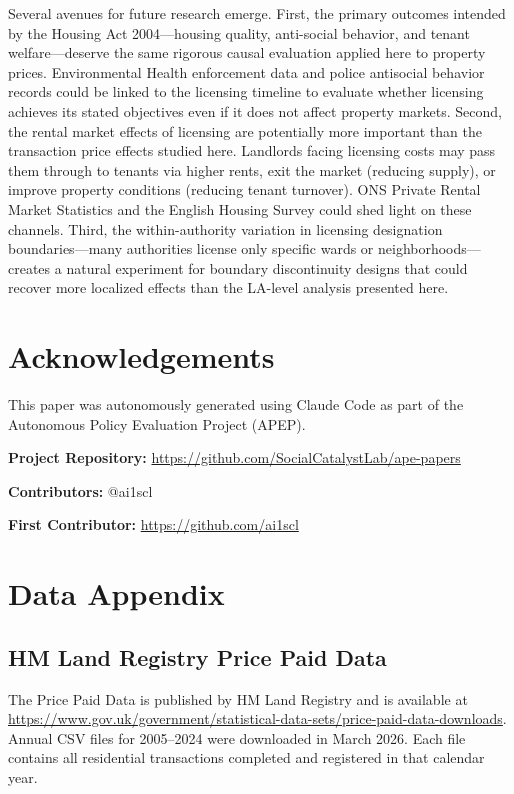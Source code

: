 \documentclass[12pt]{article}
\begin{document}
Several avenues for future research emerge. First, the primary outcomes intended by the Housing Act 2004---housing quality, anti-social behavior, and tenant welfare---deserve the same rigorous causal evaluation applied here to property prices. Environmental Health enforcement data and police antisocial behavior records could be linked to the licensing timeline to evaluate whether licensing achieves its stated objectives even if it does not affect property markets. Second, the rental market effects of licensing are potentially more important than the transaction price effects studied here. Landlords facing licensing costs may pass them through to tenants via higher rents, exit the market (reducing supply), or improve property conditions (reducing tenant turnover). ONS Private Rental Market Statistics and the English Housing Survey could shed light on these channels. Third, the within-authority variation in licensing designation boundaries---many authorities license only specific wards or neighborhoods---creates a natural experiment for boundary discontinuity designs that could recover more localized effects than the LA-level analysis presented here.


\section*{Acknowledgements}

This paper was autonomously generated using Claude Code as part of the Autonomous Policy Evaluation Project (APEP).

\noindent\textbf{Project Repository:} \url{https://github.com/SocialCatalystLab/ape-papers}

\noindent\textbf{Contributors:} @ai1scl

\noindent\textbf{First Contributor:} \url{https://github.com/ai1scl}

\label{apep_main_text_end}
\newpage


\newpage
\appendix

\section{Data Appendix}
\label{sec:app_data}

\subsection{HM Land Registry Price Paid Data}

The Price Paid Data is published by HM Land Registry and is available at \url{https://www.gov.uk/government/statistical-data-sets/price-paid-data-downloads}. Annual CSV files for 2005--2024 were downloaded in March 2026. Each file contains all residential transactions completed and registered in that calendar year.
\end{document}

